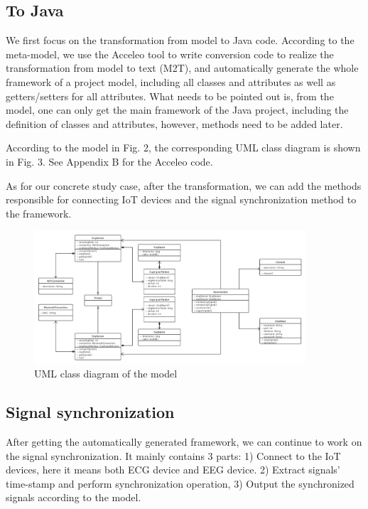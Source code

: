 \documentclass[11pt, oneside]{article}   	%
\begin{document}
\subsection{To Java}
\indent \par We first focus on the transformation from model to Java code. According to the meta-model, we use the Acceleo tool to write conversion code to realize the transformation from model to text (M2T), and automatically generate the whole framework of a project model, including all classes and attributes as well as getters/setters for all attributes. What needs to be pointed out is, from the model, one can only get the main framework of the Java project, including the definition of classes and attributes, however, methods need to be added later.\\
\indent \par According to the model in Fig. 2, the corresponding UML class diagram is shown in Fig. 3. See Appendix B for the Acceleo code. \\
\indent \par As for our concrete study case, after the transformation, we can add the methods responsible for connecting IoT devices and the signal synchronization method to the framework. 


\begin{figure}[htbp] 
\centering 
\includegraphics[width=0.9\textwidth]{UML-model.png} 
\caption{UML class diagram of the model} 
\label{Fig.main3} 
\end{figure}

\subsection{Signal synchronization}
\indent \par After getting the automatically generated framework, we can continue to work on the signal synchronization. It mainly contains 3 parts: 1) Connect to the IoT devices, here it means both ECG device and EEG device. 2) Extract signals' time-stamp and perform synchronization operation, 3) Output the synchronized signals according to the model. 
\end{document}
